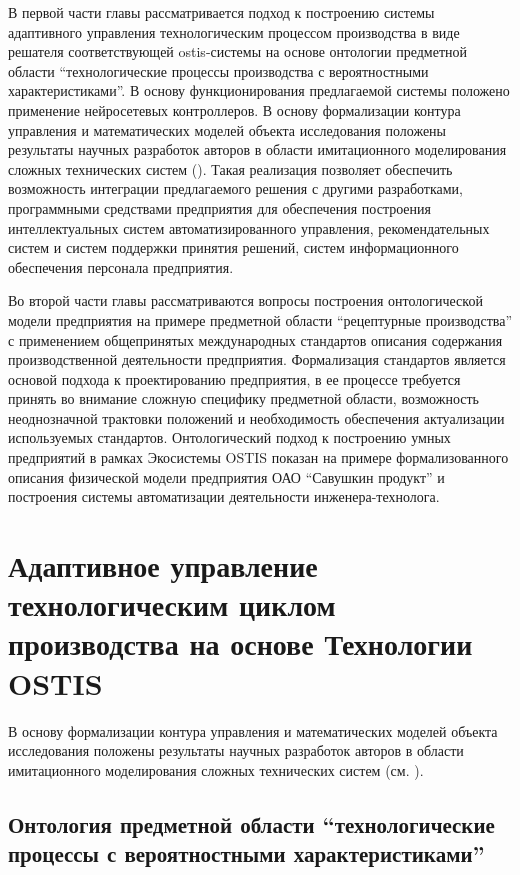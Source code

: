 В первой части главы рассматривается подход к построению системы адаптивного управления технологическим процессом производства в виде решателя соответствующей ostis-системы на основе онтологии предметной области ``технологические процессы производства с вероятностными характеристиками''. В основу функционирования предлагаемой системы положено применение нейросетевых контроллеров. В основу формализации контура управления и математических моделей объекта исследования положены результаты научных разработок авторов в области имитационного моделирования сложных технических систем (). Такая реализация позволяет обеспечить возможность интеграции предлагаемого решения с другими разработками, программными средствами предприятия для обеспечения построения интеллектуальных систем автоматизированного управления, рекомендательных систем и систем поддержки принятия решений, систем информационного обеспечения персонала предприятия.

Во второй части главы рассматриваются вопросы построения онтологической модели предприятия на примере предметной области ``рецептурные производства'' с применением общепринятых международных стандартов описания содержания производственной деятельности предприятия. Формализация стандартов является основой подхода к проектированию предприятия, в ее процессе требуется принять во внимание сложную специфику предметной области, возможность неоднозначной трактовки положений и необходимость обеспечения актуализации используемых стандартов. Онтологический подход к построению умных предприятий в рамках Экосистемы OSTIS показан на примере формализованного описания физической модели предприятия ОАО ``Савушкин продукт'' и построения системы автоматизации деятельности инженера-технолога.

\section{Адаптивное управление технологическим циклом производства на основе Технологии OSTIS}

В основу формализации контура управления и математических моделей объекта исследования положены результаты научных разработок авторов в области имитационного моделирования сложных технических систем (см. ).



\subsection{Онтология предметной области ``технологические процессы с вероятностными характеристиками''}

